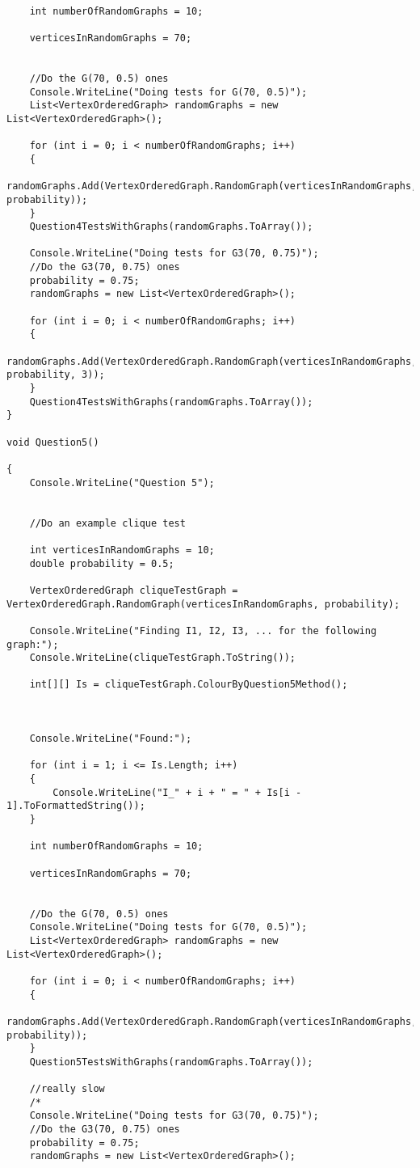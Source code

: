 \documentclass{article}
\begin{document}
\begin{lstlisting}
	
	int numberOfRandomGraphs = 10;
	
	verticesInRandomGraphs = 70;
	
	
	//Do the G(70, 0.5) ones
	Console.WriteLine("Doing tests for G(70, 0.5)");
	List<VertexOrderedGraph> randomGraphs = new List<VertexOrderedGraph>();
	
	for (int i = 0; i < numberOfRandomGraphs; i++)
	{
		randomGraphs.Add(VertexOrderedGraph.RandomGraph(verticesInRandomGraphs, probability));
	}
	Question4TestsWithGraphs(randomGraphs.ToArray());
	
	Console.WriteLine("Doing tests for G3(70, 0.75)");
	//Do the G3(70, 0.75) ones
	probability = 0.75;
	randomGraphs = new List<VertexOrderedGraph>();
	
	for (int i = 0; i < numberOfRandomGraphs; i++)
	{
		randomGraphs.Add(VertexOrderedGraph.RandomGraph(verticesInRandomGraphs, probability, 3));
	}
	Question4TestsWithGraphs(randomGraphs.ToArray());
}

void Question5()

{
	Console.WriteLine("Question 5");
	
	
	//Do an example clique test
	
	int verticesInRandomGraphs = 10;
	double probability = 0.5;
	
	VertexOrderedGraph cliqueTestGraph = VertexOrderedGraph.RandomGraph(verticesInRandomGraphs, probability);
	
	Console.WriteLine("Finding I1, I2, I3, ... for the following graph:");
	Console.WriteLine(cliqueTestGraph.ToString());
	
	int[][] Is = cliqueTestGraph.ColourByQuestion5Method();
	
	
	
	Console.WriteLine("Found:");
	
	for (int i = 1; i <= Is.Length; i++)
	{
		Console.WriteLine("I_" + i + " = " + Is[i - 1].ToFormattedString());
	}
	
	int numberOfRandomGraphs = 10;
	
	verticesInRandomGraphs = 70;
	
	
	//Do the G(70, 0.5) ones
	Console.WriteLine("Doing tests for G(70, 0.5)");
	List<VertexOrderedGraph> randomGraphs = new List<VertexOrderedGraph>();
	
	for (int i = 0; i < numberOfRandomGraphs; i++)
	{
		randomGraphs.Add(VertexOrderedGraph.RandomGraph(verticesInRandomGraphs, probability));
	}
	Question5TestsWithGraphs(randomGraphs.ToArray());
	
	//really slow
	/*
	Console.WriteLine("Doing tests for G3(70, 0.75)");
	//Do the G3(70, 0.75) ones
	probability = 0.75;
	randomGraphs = new List<VertexOrderedGraph>();
	

\end{lstlisting}
\end{document}
